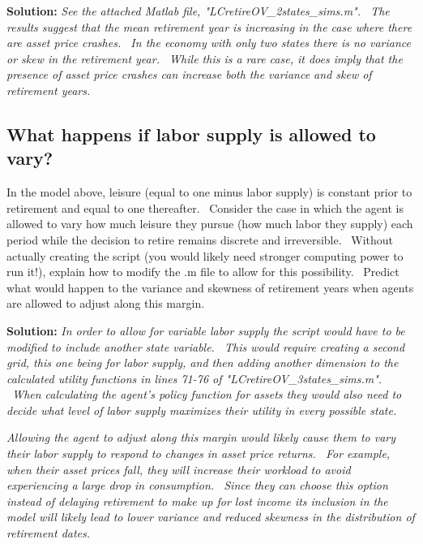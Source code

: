\documentclass[12pt]{article}
\begin{document}
{\normalsize \singlespacing}%
\noindent%
\textbf{Solution: }\textit{See the attached Matlab file,
"LCretireOV\_2states\_sims.m". \ The results suggest that the mean
retirement year is increasing in the case where there are asset price
crashes. \ In the economy with only two states there is no variance or skew
in the retirement year. \ While this is a rare case, it does imply that the
presence of asset price crashes can increase both the variance and skew of
retirement years. \ }

{\normalsize 
\onehalfspacing%
}

\subsection{What happens if labor supply is allowed to vary?}

In the model above, leisure (equal to one minus labor supply) is constant
prior to retirement and equal to one thereafter. \ Consider the case in
which the agent is allowed to vary how much leisure they pursue (how much
labor they supply) each period while the decision to retire remains discrete
and irreversible. \ Without actually creating the script (you would likely
need stronger computing power to run it!), explain how to modify the .m file
to allow for this possibility. \ Predict what would happen to the variance
and skewness of retirement years when agents are allowed to adjust along
this margin.

{\normalsize \singlespacing}%
\noindent%
\textbf{Solution: }\textit{In order to allow for variable labor supply the
script would have to be modified to include another state variable. \ This
would require creating a second grid, this one being for labor supply, and
then adding another dimension to the calculated utility functions in lines
71-76 of "LCretireOV\_3states\_sims.m". \ When calculating the agent's
policy function for assets they would also need to decide what level of
labor supply maximizes their utility in every possible state. \ }

\textit{Allowing the agent to adjust along this margin would likely cause
them to vary their labor supply to respond to changes in asset price
returns. \ For example, when their asset prices fall, they will increase
their workload to avoid experiencing a large drop in consumption. \ Since
they can choose this option instead of delaying retirement to make up for
lost income its inclusion in the model will likely lead to lower variance
and reduced skewness in the distribution of retirement dates. \ }
\end{document}
